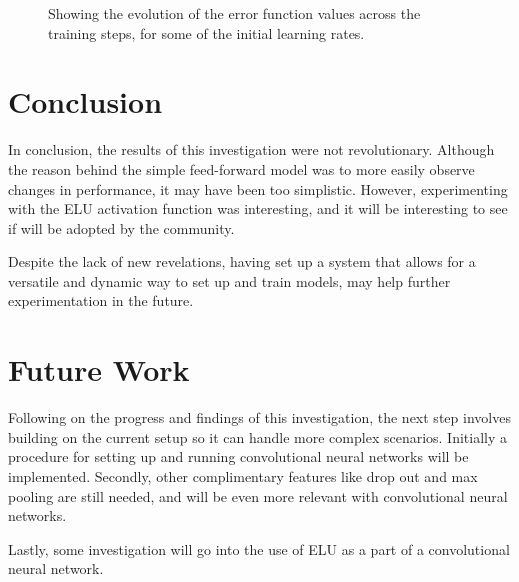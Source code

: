 \documentclass[]{article}
\begin{document}
\begin{figure}[h]
	\centering
	
	\caption{Showing the evolution of the error function values across the training steps, for some of the initial learning rates.}
	\label{res-sch}
\end{figure}

\section{Conclusion}

In conclusion, the results of this investigation were not revolutionary. Although the reason behind the simple feed-forward model was to more easily observe changes in performance, it may have been too simplistic. However, experimenting with the ELU activation function was interesting, and it will be interesting to see if will be adopted by the community. 

Despite the lack of new revelations, having set up a system that allows for a versatile and dynamic way to set up and train models, may help further experimentation in the future. 

\section{Future Work}

Following on the progress and findings of this investigation, the next step involves building on the current setup so it can handle more complex scenarios. Initially a procedure for setting up and running convolutional neural networks will be implemented. Secondly, other complimentary features like drop out and max pooling are still needed, and will be even more relevant with convolutional neural networks. 

Lastly, some investigation will go into the use of ELU as a part of a convolutional neural network. 

\clearpage
\medskip


\end{document}
